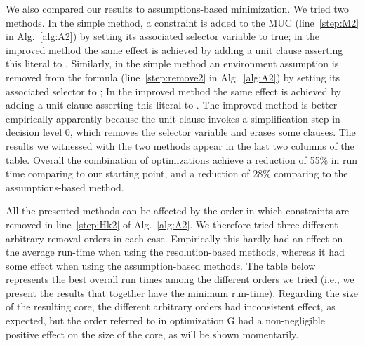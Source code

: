 \documentclass[twoside,11pt]{article}
\begin{document}
We also compared our results to assumptions-based minimization. We tried two methods. In the simple
method, a constraint is added to the MUC (line~\ref{step:M2} in
Alg.~\ref{alg:A2}) by setting its associated selector variable to true; in
the improved method the same effect is achieved by adding a unit clause
asserting this literal to \true. Similarly, in the simple method an
environment assumption is removed from the formula (line~\ref{step:remove2}
in Alg.~\ref{alg:A2}) by setting its associated selector to \false; In the
improved method the same effect is achieved by adding a unit clause asserting
this literal to \false. The improved method is better empirically apparently
because the unit clause invokes a simplification step in decision level 0,
which removes the selector variable and erases some clauses. The results we
witnessed with the two methods appear in the last two columns of the table.
Overall the combination of optimizations achieve a reduction of 55\% in run
time comparing to our starting point, and a reduction of 28\% comparing to
the assumptions-based method.


All the presented methods can be affected by the order in which constraints
are removed in line~\ref{step:Hk2} of Alg.~\ref{alg:A2}. We therefore tried three different
arbitrary removal orders in each case. Empirically this hardly had an effect
on the average run-time when using the resolution-based methods, whereas it
had some effect when using the assumption-based methods. The table below
represents the best overall run times among the different orders we tried
(i.e., we present the results that together have the minimum run-time).
Regarding the size of the resulting core, the different arbitrary orders had
inconsistent effect, as expected, but the order referred to in optimization
G had a non-negligible positive effect on the size of the core, as will
be shown momentarily.
\end{document}

